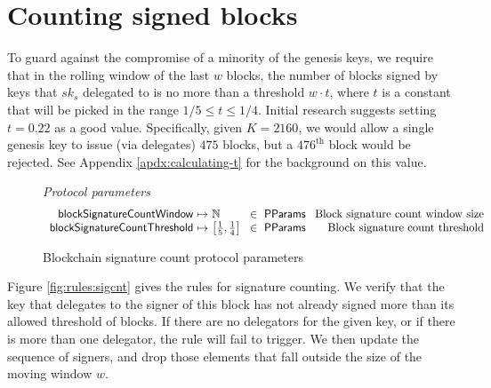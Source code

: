 \documentclass[11pt,a4paper]{article}
\newcommand{\type}[1]{\mathsf{#1}}
\newcommand{\pp}[1]{\mathsf{#1}}
\newcommand{\partialf}{\mapsto}
\newcommand{\ProtParams}{\type{PParams}} %
\begin{document}
\clearpage
\section{Counting signed blocks}

\newcommand{\BSCEnv}{\type{BSCEnv}}
\newcommand{\BSCState}{\type{BSCState}}

To guard against the compromise of a minority of the genesis keys,
we require that in the rolling window of the last $w$ blocks, the number of
blocks signed by keys that $sk_s$ delegated to is no more than a threshold $w
\cdot t$, where $t$ is a constant that will be picked in the range
$1/5 \leq t \leq 1/4$. Initial research suggests setting $t=0.22$ as a good
value. Specifically, given $K=2160$, we would allow a single genesis key to
issue (via delegates) $475$ blocks, but a $476^{\text{th}}$ block would be
rejected. See Appendix \ref{apdx:calculating-t} for the background on this value.

\begin{figure}[ht]
  \emph{Protocol parameters}
  \begin{equation*}
    \begin{array}{r@{~\partialf~}l!{~\in~\ProtParams~}r}
      \pp{blockSignatureCountWindow} & \mathbb{N} & \text{Block signature count window size} \\
      \pp{blockSignatureCountThreshold} & \left[\frac{1}{5}, \frac{1}{4}\right] & \text{Block signature count threshold} \\
    \end{array}
  \end{equation*}
  \caption{Blockchain signature count protocol parameters}
  \label{fig:defs:sigcnt}
\end{figure}

Figure \ref{fig:rules:sigcnt} gives the rules for signature counting. We verify
that the key that delegates to the signer of this block has not already signed
more than its allowed threshold of blocks. If there are no delegators for the
given key, or if there is more than one delegator, the rule will fail to trigger.
%
We then update the sequence of signers, and drop those elements that fall
outside the size of the moving window $w$.
\end{document}
